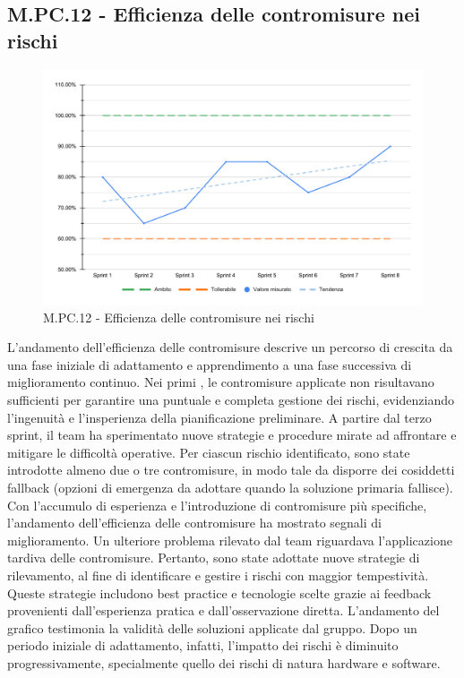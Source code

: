 \subsection{M.PC.12 - Efficienza delle contromisure nei rischi}
\begin{figure}[H]
    \centering
    \includegraphics[width=\textwidth]{assets/efficienza_contromisure.pdf}
    \caption{M.PC.12 - Efficienza delle contromisure nei rischi}
\end{figure}

\par L'andamento dell'efficienza delle contromisure descrive un percorso di crescita da una fase iniziale di adattamento e apprendimento a una fase successiva di miglioramento continuo. Nei primi , le contromisure applicate non risultavano sufficienti per garantire una puntuale e completa gestione dei rischi, evidenziando l’ingenuità e l’insperienza della pianificazione preliminare. A partire dal terzo sprint, il team ha sperimentato nuove strategie e procedure mirate ad affrontare e mitigare le difficoltà operative. Per ciascun rischio identificato, sono state introdotte almeno due o tre contromisure, in modo tale da disporre dei cosiddetti fallback (opzioni di emergenza da adottare quando la soluzione primaria fallisce). Con l'accumulo di esperienza e l’introduzione di contromisure più specifiche, l'andamento dell'efficienza delle contromisure ha mostrato segnali di miglioramento. Un ulteriore problema rilevato dal team riguardava l’applicazione tardiva delle contromisure. Pertanto, sono state adottate nuove strategie di rilevamento, al fine di identificare e gestire i rischi con maggior tempestività. Queste strategie includono best practice e tecnologie scelte grazie ai feedback provenienti dall'esperienza pratica e dall’osservazione diretta. L’andamento del grafico testimonia la validità delle soluzioni applicate dal gruppo. Dopo un periodo iniziale di adattamento, infatti, l'impatto dei rischi è diminuito progressivamente, specialmente quello dei rischi di natura hardware e software.
